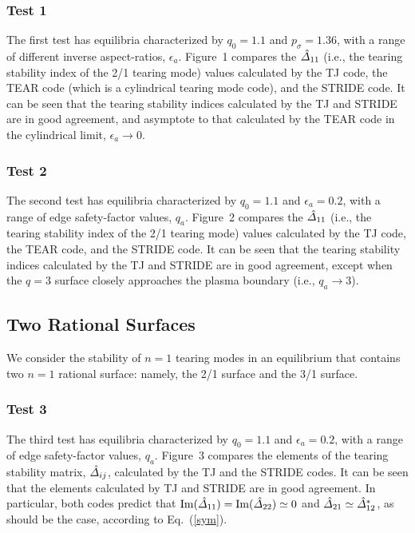 \documentclass[12pt,prb,aps,notitlepage]{revtex4-1}
\begin{document}
\subsubsection{Test 1}
The first test has equilibria characterized by $q_0=1.1$ and $p_\sigma=1.36$, with a range of different inverse aspect-ratios, $\epsilon_a$. 
Figure~1 compares the $\hat{\mit\Delta}_{11}$ (i.e.,
the tearing stability index of the 2/1 tearing mode) values calculated by the TJ code,\cite{tj} the TEAR code (which is a cylindrical tearing mode code), and
the STRIDE code. It can be seen that the tearing stability indices calculated by the TJ and STRIDE are in good agreement, and asymptote to that calculated by the TEAR code
in the cylindrical limit, $\epsilon_a\rightarrow 0$. 

\subsubsection{Test 2}
The second test has equilibria characterized by $q_0=1.1$ and $\epsilon_a=0.2$, with a range of edge safety-factor values, $q_a$. 
Figure~2 compares the $\hat{\mit\Delta}_{11}$ (i.e.,
the tearing stability index of the 2/1 tearing mode) values calculated by the TJ code, the TEAR code, and
the STRIDE code. It can be seen that the tearing stability indices calculated by the TJ and STRIDE are in good agreement, except when the $q=3$ surface closely approaches the
plasma boundary (i.e., $q_a\rightarrow 3$). 
 
 \subsection{Two Rational Surfaces}
 We consider the stability of $n=1$ tearing modes 
in an equilibrium  that  contains two $n=1$ rational surface: namely, the 2/1 surface and the 3/1 surface. 

\subsubsection{Test 3}
The third test has equilibria characterized by $q_0=1.1$ and $\epsilon_a=0.2$, with a range of edge safety-factor values, $q_a$. 
Figure~3 compares the elements of the tearing stability matrix, $\hat{\mit\Delta}_{ij}$,  calculated by the TJ and the STRIDE codes. It can be seen that the elements calculated by
TJ and STRIDE are in good agreement. In particular, both codes predict that ${\rm Im}(\hat{\mit\Delta}_{11})={\rm Im}(\hat{\mit\Delta}_{22}) \simeq 0$ and $\hat{\mit\Delta}_{21}\simeq \hat{\mit\Delta}_{12}^\ast$, as should be the case, according to Eq.~(\ref{sym}).
\end{document}
